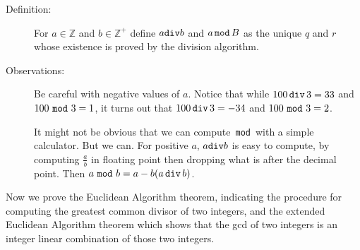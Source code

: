 \documentclass[12pt]{article}
\begin{document}
\begin{description}
\item[Definition:]  For $a \in {\mathbb Z}$ and $b \in {\mathbb Z}^+$ define $a {\tt div} b$ and $a \,{\tt mod}\, B$ as the unique $q$ and $r$ whose existence is proved by the division algorithm.

\item[Observations:]  Be careful with negative values of $a$.  Notice that while $100 \,{\tt div}\, 3 = 33$ and $100\, \,{\tt mod}\,\, 3 = 1$, it turns out that 
$100\, {\tt div}\, 3 = -34$ and $100 \,\,{\tt mod}\, \,3 = 2$.

It might not be obvious that we can compute \,{\tt mod}\, with a simple calculator.  But we can.  For positive $a$, $a {\tt div} b$ is easy to compute, by computing $\frac ab$ in floating point then dropping what is after the decimal point.  Then $a\, \,{\tt mod}\,\, b=a - b(a\,{\tt div}\,b)$.


\end{description}

Now we prove the Euclidean Algorithm theorem, indicating the procedure for computing the greatest common divisor of two integers, and the extended Euclidean Algorithm theorem which shows that the gcd of two integers is an integer linear combination of those two integers.
\end{document}
